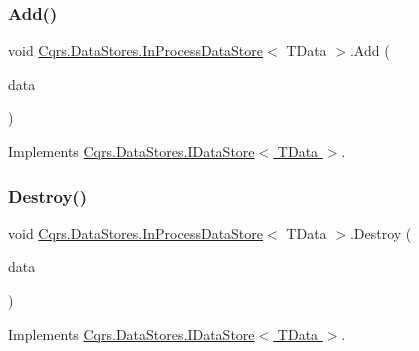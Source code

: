 \subsubsection{\texorpdfstring{Add()}{Add()}\hspace{0.1cm}{\footnotesize\ttfamily [2/2]}}
{\footnotesize\ttfamily void \hyperlink{classCqrs_1_1DataStores_1_1InProcessDataStore}{Cqrs.\+Data\+Stores.\+In\+Process\+Data\+Store}$<$ T\+Data $>$.Add (\begin{DoxyParamCaption}\item[{I\+Enumerable$<$ T\+Data $>$}]{data }\end{DoxyParamCaption})}



Implements \hyperlink{interfaceCqrs_1_1DataStores_1_1IDataStore_a906f3f2f80db7a549a4170eca4653e26}{Cqrs.\+Data\+Stores.\+I\+Data\+Store$<$ T\+Data $>$}.

\mbox{\label{classCqrs_1_1DataStores_1_1InProcessDataStore_a1fc7a3935f52087f3703b652e77f0b75}} 
\subsubsection{\texorpdfstring{Destroy()}{Destroy()}}
{\footnotesize\ttfamily void \hyperlink{classCqrs_1_1DataStores_1_1InProcessDataStore}{Cqrs.\+Data\+Stores.\+In\+Process\+Data\+Store}$<$ T\+Data $>$.Destroy (\begin{DoxyParamCaption}\item[{T\+Data}]{data }\end{DoxyParamCaption})}



Implements \hyperlink{interfaceCqrs_1_1DataStores_1_1IDataStore_aa7ade96f2f3151d5353cf7bdbb2baec5}{Cqrs.\+Data\+Stores.\+I\+Data\+Store$<$ T\+Data $>$}.

\mbox{\label{classCqrs_1_1DataStores_1_1InProcessDataStore_a220126a1dd0e318197b9c994c313d5fd}} 
